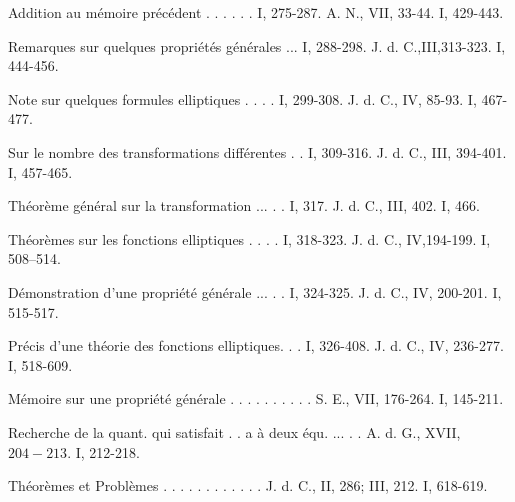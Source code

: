 \documentclass{article}
\begin{document}
Addition au mémoire précédent . . . . . . I, 275-287. A. N., VII, 33-44. I, 429-443.

Remarques sur quelques propriétés générales ... I, 288-298. J. d. C.,III,313-323. I, 444-456.

Note sur quelques formules elliptiques . . . . I, 299-308. J. d. C., IV, 85-93. I, 467-477.

Sur le nombre des transformations différentes . . I, 309-316. J. d. C., III, 394-401. I, 457-465.

Théorème général sur la transformation ... . . I, 317. J. d. C., III, 402. I, 466.

Théorèmes sur les fonctions elliptiques . . . . I, 318-323. J. d. C., IV,194-199. I, 508--514.

Démonstration d'une propriété générale ... . . I, 324-325. J. d. C., IV, 200-201. I, 515-517.

Précis d'une théorie des fonctions elliptiques. . . I, 326-408. J. d. C., IV, 236-277. I, 518-609.

Mémoire sur une propriété générale . . . . . . . . . . S. E., VII, 176-264. I, 145-211.

Recherche de la quant. qui satisfait . . a à deux équ. ... . . A. d. G., XVII, \(204-213\). I, 212-218.

Théorèmes et Problèmes . . . . . . . . . . . . J. d. C., II, 286; III, 212. I, 618-619.
\end{document}
